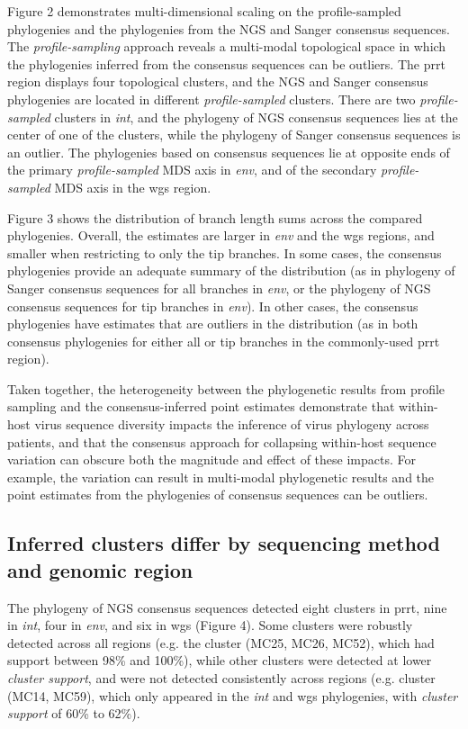 \documentclass[letterpaper]{article}
\begin{document}
Figure 2 demonstrates multi-dimensional scaling on the profile-sampled phylogenies and the phylogenies from the NGS and Sanger consensus sequences. The \emph{profile-sampling} approach reveals a multi-modal topological space in which the phylogenies inferred from the consensus sequences can be outliers. The prrt region displays four topological clusters, and the NGS and Sanger consensus phylogenies are located in different \emph{profile-sampled} clusters. There are two \emph{profile-sampled} clusters in \emph{int}, and the phylogeny of NGS consensus sequences lies at the center of one of the clusters, while the phylogeny of Sanger consensus sequences is an outlier. The phylogenies based on consensus sequences lie at opposite ends of the primary \emph{profile-sampled} MDS axis in \emph{env}, and of the secondary \emph{profile-sampled} MDS axis in the wgs region.

Figure 3 shows the distribution of branch length sums across the compared phylogenies. Overall, the estimates are larger in \emph{env} and the wgs regions, and smaller when restricting to only the tip branches. In some cases, the consensus phylogenies provide an adequate summary of the distribution (as in phylogeny of Sanger consensus sequences for all branches in \emph{env}, or the phylogeny of NGS consensus sequences for tip branches in \emph{env}). In other cases, the consensus phylogenies have estimates that are outliers in the distribution (as in both consensus phylogenies for either all or tip branches in the commonly-used prrt region).

Taken together, the heterogeneity between the phylogenetic results from profile sampling and the consensus-inferred point estimates demonstrate that within-host virus sequence diversity impacts the inference of virus phylogeny across patients, and that the consensus approach for collapsing within-host sequence variation can obscure both the magnitude and effect of these impacts. For example, the variation can result in multi-modal phylogenetic results and the point estimates from the phylogenies of consensus sequences can be outliers.

\subsection*{Inferred clusters differ by sequencing method and genomic region}

The phylogeny of NGS consensus sequences detected eight clusters in prrt, nine in \emph{int}, four in \emph{env}, and six in wgs (Figure 4). Some clusters were robustly detected across all regions (e.g. the cluster (MC25, MC26, MC52), which had support between 98\% and 100\%), while other clusters were detected at lower \emph{cluster support}, and were not detected consistently across regions (e.g. cluster (MC14, MC59), which only appeared in the \emph{int} and wgs phylogenies, with \emph{cluster support} of 60\% to 62\%).
\end{document}
